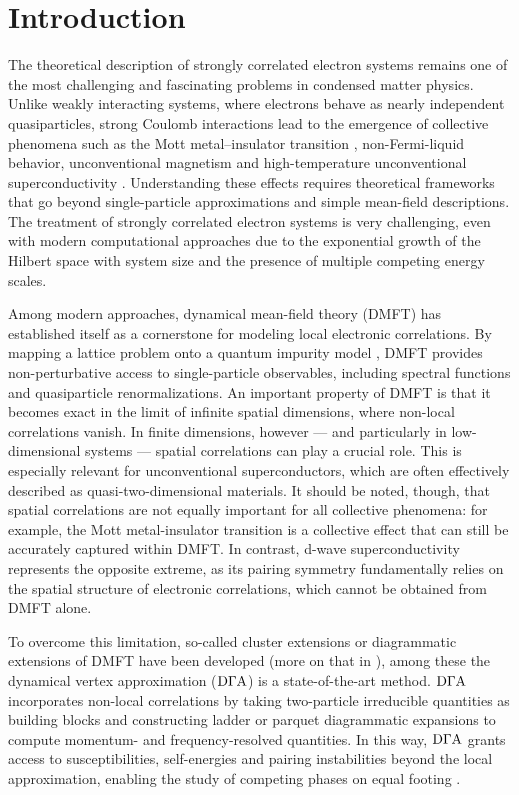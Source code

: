\documentclass[../../main.tex]{subfiles}
\begin{document}
\chapter{Introduction}

The theoretical description of strongly correlated electron systems remains one of the most challenging and fascinating problems in condensed matter physics. Unlike weakly interacting systems, where electrons behave as nearly independent quasiparticles, strong Coulomb interactions lead to the emergence of collective phenomena such as the Mott metal–insulator transition \cite{Imada1998}, non-Fermi-liquid behavior, unconventional magnetism \cite{Liu2025} and high-temperature unconventional superconductivity \cite{Keimer2015}. Understanding these effects requires theoretical frameworks that go beyond single-particle approximations and simple mean-field descriptions. The treatment of strongly correlated electron systems is very challenging, even with modern computational approaches due to the exponential growth of the Hilbert space with system size and the presence of multiple competing energy scales.
\newline

Among modern approaches, dynamical mean-field theory (DMFT) \cite{Georges1996} has established itself as a cornerstone for modeling local electronic correlations. By mapping a lattice problem onto a quantum impurity model \cite{Georges1992}, DMFT provides non-perturbative access to single-particle observables, including spectral functions and quasiparticle renormalizations. An important property of DMFT is that it becomes exact in the limit of infinite spatial dimensions, where non-local correlations vanish. In finite dimensions, however --- and particularly in low-dimensional systems --- spatial correlations can play a crucial role. This is especially relevant for unconventional superconductors, which are often effectively described as quasi-two-dimensional materials. It should be noted, though, that spatial correlations are not equally important for all collective phenomena: for example, the Mott metal-insulator transition is a collective effect that can still be accurately captured within DMFT. In contrast, d-wave superconductivity represents the opposite extreme, as its pairing symmetry fundamentally relies on the spatial structure of electronic correlations, which cannot be obtained from DMFT alone.
\newline

To overcome this limitation, so-called cluster extensions or diagrammatic extensions of DMFT have been developed (more on that in ), among these the dynamical vertex approximation ($\text{D}\Gamma\text{A}$) \cite{Toschi2007, Rohringer2018} is a state-of-the-art method. $\text{D}\Gamma\text{A}$ incorporates non-local correlations by taking two-particle irreducible quantities as building blocks and constructing ladder or parquet diagrammatic expansions to compute momentum- and frequency-resolved quantities. In this way, $\text{D}\Gamma\text{A}$ grants access to susceptibilities, self-energies and pairing instabilities beyond the local approximation, enabling the study of competing phases on equal footing \cite{Rohringer2016}.
\newline
\end{document}
